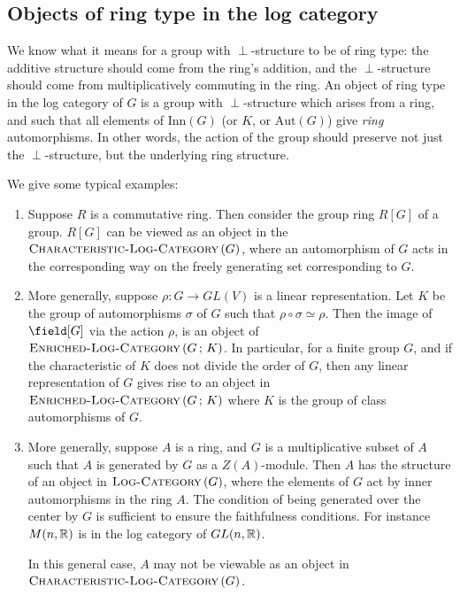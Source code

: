 \documentclass[a4paper]{amsart}
\newcommand{\logcategory}[1]{\textsc{Log-Category}\left(#1\right)}
\newcommand{\enrichedlogcategory}[2]{\textsc{Enriched-Log-Category}\left(#1 \, ; \, #2\right)}
\newcommand{\characteristiclogcategory}[1]{\textsc{Characteristic-Log-Category}\left(#1 \right)}
\newcommand{\aut}[1]{\text{Aut}\left(#1\right)}
\newcommand{\inn}[1]{\text{Inn}\left(#1\right)}
\begin{document}
\subsection{Objects of ring type in the log category}

We know what it means for a group with $\perp$-structure to be of ring
type: the additive structure should come from the ring's addition, and
the $\perp$-structure should come from multiplicatively commuting in
the ring. An object of ring type in the log category of $G$ is a group
with $\perp$-structure which arises from a ring, and such that all
elements of $\inn{G}$ (or $K$, or $\aut{G}$) give {\em ring}
automorphisms. In other words, the action of the group should preserve
not just the $\perp$-structure, but the underlying ring structure.

We give some typical examples:

\begin{enumerate}

\item Suppose $R$ is a commutative ring. Then consider the group ring
  $R[G]$ of a group. $R[G]$ can be viewed as an object in the
  $\characteristiclogcategory{G}$, where an automorphism of $G$
  acts in the corresponding way on the freely generating set
  corresponding to $G$.

\item More generally, suppose $\rho:G \to GL(V)$ is a linear
  representation. Let $K$ be the group of automorphisms $\sigma$ of
  $G$ such that $\rho \circ \sigma \simeq \rho$. Then the image of
  $\field[G]$ via the action $\rho$, is an object of
  $\enrichedlogcategory{G}{K}$. In particular, for a finite group $G$,
  and if the characteristic of $K$ does not divide the order of $G$,
  then any linear representation of $G$ gives rise to an object in
  $\enrichedlogcategory{G}{K}$ where $K$ is the group of class
  automorphisms of $G$.
  
\item More generally, suppose $A$ is a ring, and $G$ is a
  multiplicative subset of $A$ such that $A$ is generated by $G$ as a
  $Z(A)$-module. Then $A$ has the structure of an object in
  $\logcategory{G}$, where the elements of $G$ act by inner
  automorphisms in the ring $A$. The condition of being generated over
  the center by $G$ is sufficient to ensure the faithfulness
  conditions. For instance $M(n,\mathbb{R})$ is in the log category of
  $GL(n,\mathbb{R})$.

  In this general case, $A$ may not be viewable as an object in
  $\characteristiclogcategory{G}$.

\end{enumerate}
\end{document}

